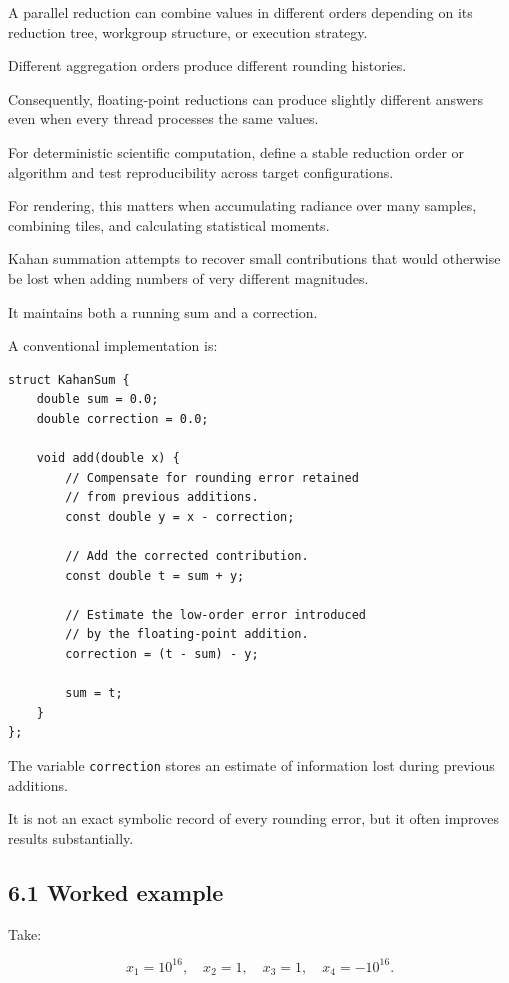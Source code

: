 A parallel reduction can combine values in different orders depending on its reduction tree, workgroup structure, or execution strategy.

Different aggregation orders produce different rounding histories.

Consequently, floating-point reductions can produce slightly different answers even when every thread processes the same values.

For deterministic scientific computation, define a stable reduction order or algorithm and test reproducibility across target configurations.

For rendering, this matters when accumulating radiance over many samples, combining tiles, and calculating statistical moments.

Kahan summation attempts to recover small contributions that would otherwise be lost when adding numbers of very different magnitudes.

It maintains both a running sum and a correction.

A conventional implementation is:

\begin{verbatim}
struct KahanSum {
    double sum = 0.0;
    double correction = 0.0;

    void add(double x) {
        // Compensate for rounding error retained
        // from previous additions.
        const double y = x - correction;

        // Add the corrected contribution.
        const double t = sum + y;

        // Estimate the low-order error introduced
        // by the floating-point addition.
        correction = (t - sum) - y;

        sum = t;
    }
};
\end{verbatim}

The variable \texttt{correction} stores an estimate of information lost during previous additions.

It is not an exact symbolic record of every rounding error, but it often improves results substantially.

\subsection{6.1 Worked example}\label{02-foundations-ii-ch028-worked-example}

Take:

\[ x_1=10^{16},\quad x_2=1,\quad x_3=1,\quad x_4=-10^{16}. \]

